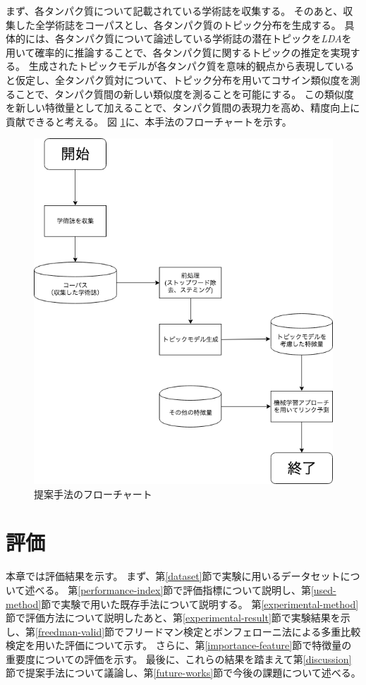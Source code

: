 \documentclass[titlepage,12pt]{jreport}
\begin{document}
まず、各タンパク質について記載されている学術誌を収集する。 そのあと、収集した全学術誌をコーパスとし、各タンパク質のトピック分布を生成する。 具体的には、各タンパク質について論述している学術誌の潜在トピックを{\it LDA}を用いて確率的に推論することで、各タンパク質に関するトピックの推定を実現する。 生成されたトピックモデルが各タンパク質を意味的観点から表現していると仮定し、全タンパク質対について、トピック分布を用いてコサイン類似度を測ることで、タンパク質間の新しい類似度を測ることを可能にする。 この類似度を新しい特徴量として加えることで、タンパク質間の表現力を高め、精度向上に貢献できると考える。 図 \ref{fig:diagram}に、本手法のフローチャートを示す。
\begin{figure}[htbp]
\centering
\includegraphics[width = 130mm]{img/diagram.png}
\caption{提案手法のフローチャート}
\label{fig:diagram}
\end{figure}

\chapter{評価\label{valid}}
本章では評価結果を示す。 まず、第\ref{dataset}節で実験に用いるデータセットについて述べる。 第\ref{performance-index}節で評価指標について説明し、第\ref{used-method}節で実験で用いた既存手法について説明する。 第\ref{experimental-method}節で評価方法について説明したあと、第\ref{experimental-result}節で実験結果を示し、第\ref{freedman-valid}節でフリードマン検定とボンフェローニ法による多重比較検定を用いた評価について示す。 さらに、第\ref{importance-feature}節で特徴量の重要度についての評価を示す。
最後に、これらの結果を踏まえて第\ref{discussion}節で提案手法について議論し、第\ref{future-works}節で今後の課題について述べる。
\end{document}

